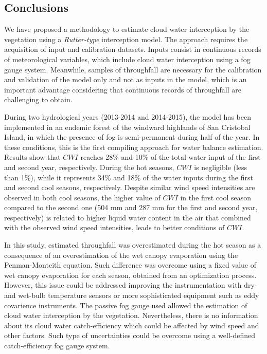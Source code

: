 \documentclass[a4paper,12pt]{article}
\begin{document}
\begin{linenumbers}
\section{Conclusions}
We have proposed a methodology to estimate cloud water interception by the vegetation using a \textit{Rutter-type} interception model. The approach requires the acquisition of input and calibration datasets. Inputs consist in continuous records of meteorological variables, which include cloud water interception using a fog gauge system. Meanwhile, samples of throughfall are necessary for the calibration and validation of the model only and not as inputs in the model, which is an important advantage considering that continuous records of throughfall are challenging to obtain.

During two hydrological years (2013-2014 and 2014-2015), the model has been implemented in an endemic forest of the windward highlands of San Cristobal Island, in which the presence of fog is semi-permanent during half of the year. In these conditions, this is the first compiling approach for water balance estimation. Results show that $CWI$ reaches 28\% and 10\% of the total water input of the first and second year, respectively. During the hot seasons, $CWI$ is negligible (less than 1\%), while it represents 34\% and 18\% of the water inputs during the first and second cool seasons, respectively. Despite similar wind speed intensities are observed in both cool seasons, the higher value of $CWI$ in the first cool season compared to the second one (504 mm and 287 mm for the first and second year, respectively) is related to higher liquid water content in the air that combined with the observed wind speed intensities, leads to better conditions of $CWI$.  

In this study, estimated throughfall was overestimated during the hot season as a consequence of an overestimation of the wet canopy evaporation using the Penman-Monteith equation. Such difference was overcome using a fixed value of wet canopy evaporation for each season, obtained from an optimization process. However, this issue could be addressed improving the instrumentation with  dry- and wet-bulb temperature sensors or more sophisticated equipment such as eddy covarience instruments. The passive fog gauge used allowed the estimation of cloud water interception by the vegetation. Nevertheless, there is no information about its cloud water catch-efficiency which could be affected by wind speed and other factors. Such type of uncertainties could be overcome using a well-defined catch-efficiency fog gauge system. 


\end{linenumbers}
\end{document}
